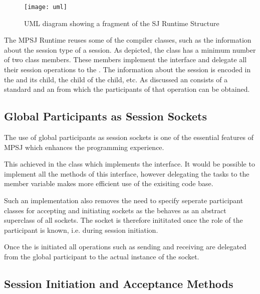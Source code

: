 \begin{figure}[H]
\begin{center}
\texttt{[image: uml]}
\caption{UML diagram showing a fragment of the SJ Runtime Structure}
\label{fig:runtimeuml}
\end{center}
\end{figure}

The MPSJ Runtime reuses some of the compiler classes, such as the information about the session type of a session. As depicted, the  class has a minimum number of two  class members. These members implement the  interface and delegate all their session operations to the . The information about the session is encoded in the  and its child, the child of the child, etc. As discussed an  consists of a standard  and an  from which the participants of that operation can be obtained.


\subsection{Global Participants as Session Sockets}

The use of global participants as session sockets is one of the essential features of MPSJ which enhances the programming experience.

This achieved in the class  which implements the  interface. It would be possible to implement all the methods of this interface, however delegating the tasks to the  member variable makes more efficient use of the exisiting code base.

Such an implementation also removes the need to specify seperate participant classes for accepting and initiating sockets as the  behaves as an abstract superclass of all sockets. The socket is therefore inititated once the role of the participant is known, i.e. during session initiation.

Once the  is initiated all operations such as sending and receiving are delegated from the global participant to the actual instance of the socket.

\subsection{Session Initiation and Acceptance Methods}

